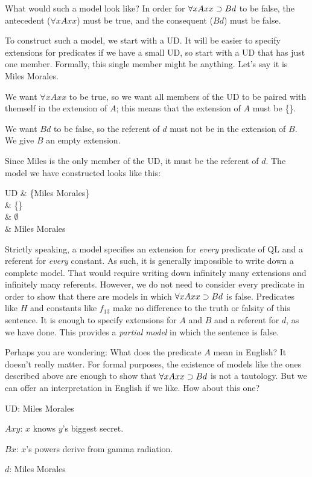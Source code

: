 What would such a model look like? In order for $\forall xAxx \supset Bd$ to be false, the antecedent ($\forall x Axx$) must be true, and the consequent ($Bd$) must be false.

To construct such a model, we start with a UD. It will be easier to specify extensions for predicates if we have a small UD, so start with a UD that has just one member. Formally, this single member might be anything. Let's say it is Miles Morales.

We want $\forall x Axx$ to be true, so we want all members of the UD to be paired with themself in the extension of $A$; this means that the extension of $A$ must be \{\}.

We want $Bd$ to be false, so the referent of $d$ must not be in the extension of $B$. We give $B$ an empty extension.

Since Miles is the only member of the UD, it must be the referent of $d$. The model we have constructed looks like this:
\begin{partialmodel}
	UD			& \{Miles Morales\}\\
	 	& \{\}\\
		& $\emptyset$\\
		& Miles Morales
\end{partialmodel}

Strictly speaking, a model specifies an extension for \emph{every} predicate of QL and a referent for \emph{every} constant. As such, it is generally impossible to write down a complete model. That would require writing down infinitely many extensions and infinitely many referents. However, we do not need to consider every predicate in order to show that there are models in which $\forall xAxx \supset Bd$ is false. Predicates like $H$ and constants like $f_{13}$ make no difference to the truth or falsity of this sentence. It is enough to specify extensions for $A$ and $B$ and a referent for $d$, as we have done. This provides a \emph{partial model} in which the sentence is false.

Perhaps you are wondering: What does the predicate $A$ mean in English? It doesn't really matter. For formal purposes, the existence of models like the ones described above are enough to show that $\forall x Axx \supset Bd$ is not a tautology. But we can offer an interpretation in English if we like. How about this one?

\begin{ekey}
\item[UD:] Miles Morales
\item[$Axy$:] $x$ knows $y$'s biggest secret.
\item[$Bx$:] $x$'s powers derive from gamma radiation.
\item[$d$:] Miles Morales
\end{ekey}

